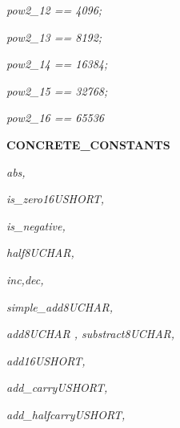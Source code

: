 \documentclass[11pt]{article}
\begin{document}
\begin{sloppypar}
\hspace*{0.20in}\it pow2\_12 \rm == \rm 4\rm 0\rm 9\rm 6\rm ;\hspace*{0.15in}

\hspace*{0.20in}\it pow2\_13 \rm == \rm 8\rm 1\rm 9\rm 2\rm ;

\hspace*{0.20in}\it pow2\_14 \rm == \rm 1\rm 6\rm 3\rm 8\rm 4\rm ;\hspace*{0.15in}

\hspace*{0.20in}\it pow2\_15 \rm == \rm 3\rm 2\rm 7\rm 6\rm 8\rm ; 

\hspace*{0.20in}\it pow2\_16 \rm == \rm 6\rm 5\rm 5\rm 3\rm 6\hspace*{0.35in}

\hspace*{0.20in}

\hspace*{0.20in}

\bf CONCRETE\_CONSTANTS

\hspace*{0.20in}\it abs\rm ,

\hspace*{0.20in}

\hspace*{0.20in}\it is\_zero16USHORT\rm ,

\hspace*{0.20in}\it is\_negative\rm ,

\hspace*{0.20in}

\hspace*{0.20in}\it half8UCHAR\rm ,

\hspace*{0.20in}\it inc\rm ,\it dec\rm ,

\hspace*{0.20in}\it simple\_add8UCHAR\rm ,

\hspace*{0.20in}\it add8UCHAR \rm , \it substract8UCHAR\rm ,

\hspace*{0.20in}

\hspace*{0.20in}\it add16USHORT\rm ,

\hspace*{0.20in}\it add\_carryUSHORT\rm ,

\hspace*{0.20in}\it add\_halfcarryUSHORT\rm ,


\end{sloppypar}
\end{document}
